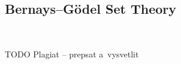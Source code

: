 \documentclass[12pt,a4paper]{article}
\newtheorem{definition}[theorem]{Definition}
\renewcommand{\iff}{\leftrightarrow}
\newcommand{\then}{\rightarrow}
\newcommand{\bce}{\begin{compactenum}}
\begin{document}
\subsection{Bernays–G{\"o}del Set Theory}

\

TODO Plagiat -- prepsat a~vysvetlit

{\color{red}
\begin{comment}

G{\"o}del–Bernays set theory, also known as Von Neumann–Bernays–G{\"o}del set theory is an axiomatic set theory that 
explicitly talks about proper classes as well as sets, which allows it to be finitely axiomatizable, albeit our version stated below contains one schema. It is a~conservative extension of Zermalo–Fraenkel set theory. Using forcing, one can prove equiconsistency of BGC and ZFC.
\newline
 
Bernays–G{\"o}del set theory contains two types of objects: proper classes and sets. The notion of set, usually denoted by a~lower case letter, is identical to set in ZF, whereas proper classes are usually denoted by upper case letters. The difference between the two is in a~fact, that 
proper classes are not members of other classes, sets, on the other hand, have to be members of classes.
\begin{definition}(G{\"o}del–Bernay set theory)
\bce[(i)]
\item \emph{extensionality for sets}
\begin{equation}
\forall a \forall b [\forall x(x \in a~\iff x \in b) \then a = b]
\end{equation}
\item \emph{pairing for sets}
\begin{equation}
\forall x \forall y \exists z \forall w [w \in z \iff (w = x \lor w = y)]
\end{equation}
\item \emph{union for sets}
\begin{equation}
\forall a \exists b \forall c [c \in b \iff \exists d ( c \in d \land d \in a)]
\end{equation}
\item \emph{powers for sets}
\begin{equation}
\forall a \exists p \forall b [b \in p \iff (c \in b \then c \in a)]
\end{equation}
\item \emph{infinity for sets}
\begin{equation}
\mbox{There is an inductive set.}
\end{equation}
\item \emph{Extensionality for classes}
\begin{equation}
\forall x (x \in A \iff x \in B) \then A = B
\end{equation}


\end{comment}}
\end{document}

